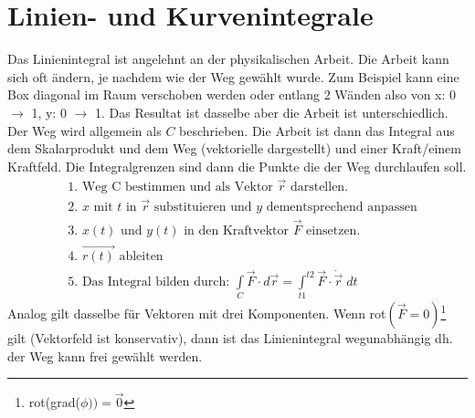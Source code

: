 \documentclass[a4paper,10pt]{scrartcl}
\begin{document}
    \section{Linien- und Kurvenintegrale}
        Das Linienintegral ist angelehnt an der physikalischen Arbeit. Die Arbeit kann sich oft ändern, je nachdem wie der Weg gewählt wurde. Zum Beispiel kann eine Box diagonal im Raum verschoben werden
        oder entlang 2 Wänden also von x: 0 \(\rightarrow\) 1, y: 0 \(\rightarrow\) 1. Das Resultat ist dasselbe aber die Arbeit ist unterschiedlich. \\
        Der Weg wird allgemein als \(C\) beschrieben. Die Arbeit ist dann das Integral aus dem Skalarprodukt und dem Weg (vektorielle dargestellt) und einer Kraft/einem Kraftfeld. Die Integralgrenzen
        sind dann die Punkte die der Weg durchlaufen soll.
        \begin{equation*}
            \begin{aligned}
                & \text{1. Weg C bestimmen und als Vektor \(\vec{r}\) darstellen. } \\
                & \text{2. \(x\) mit \(t\) in \(\vec{r}\) substituieren und \(y\) dementsprechend anpassen} \\
                & \text{3. \(x(t)\) und \(y(t)\) in den Kraftvektor \(\vec{F}\) einsetzen.  } \\
                & \text{4. \(\vec{r(t)}\) ableiten } \\
                & \text{5. Das Integral bilden durch: } {\int\limits_C} \vec{F} \cdot d\vec{r} = {\int\limits_{t1}}^{t2} \vec{F} \cdot \dot{\vec{r}} \; dt
            \end{aligned}
        \end{equation*}
        Analog gilt dasselbe für Vektoren mit drei Komponenten. Wenn rot\((\vec{F} = 0)\)\footnote{rot(grad(\(\phi)) = \vec{0} \)} gilt (Vektorfeld ist konservativ),
        dann ist das Linienintegral wegunabhängig dh. der Weg kann frei gewählt werden.
\end{document}
